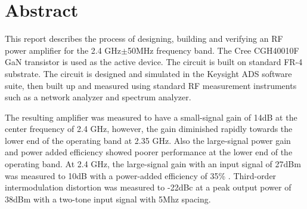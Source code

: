 \chapter*{Abstract}
This report describes the process of designing, building and verifying an RF power amplifier for the 2.4 GHz$\pm$50MHz frequency band. The Cree CGH40010F GaN transistor is used as the active device. The circuit is built on standard FR-4 substrate. The circuit is designed and simulated in the Keysight ADS software suite, then built up and measured using standard RF measurement instruments such as a network analyzer and spectrum analyzer.

The resulting amplifier was measured to have a small-signal gain of 14dB at the center frequency of 2.4 GHz, however, the gain diminished rapidly towards the lower end of the operating band at 2.35 GHz. Also the large-signal power gain and power added efficiency showed poorer performance at the lower end of the operating band. At 2.4 GHz, the large-signal gain with an input signal of 27dBm was measured to 10dB with a power-added efficiency of 35\% . Third-order intermodulation distortion was measured to -22dBc at a peak output power of 38dBm with a two-tone input signal with 5Mhz spacing.
